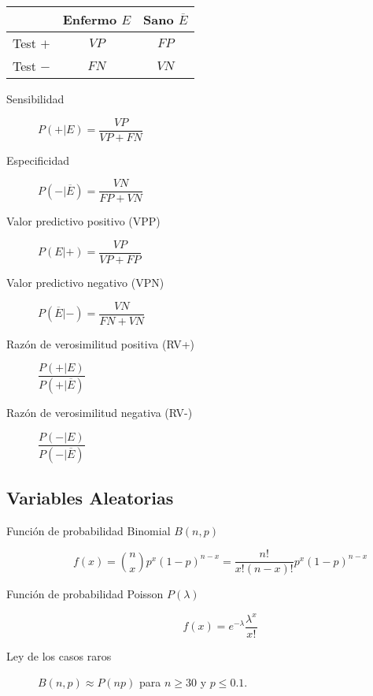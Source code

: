 \begin{multicols*}{2}
\begin{tcolorbox}[hbox, title=Test diagnósticos]
\begin{minipage}{0.4\textwidth}
\begin{center}
\begin{tabular}{|l|c|c|}
\cline{2-3}
\multicolumn{1}{c|}{} & Enfermo $E$ & Sano $\overline E$ \\
\hline
Test $+$              & $VP$    & $FP$ \\
\hline
Test $-$              & $FN$    & $VN$ \\
\hline
\end{tabular}
\end{center}
\begin{description}
\item[Sensibilidad] $P(+|E)=\dfrac{VP}{VP+FN}$
\item[Especificidad] $P(-|\overline{E})=\dfrac{VN}{FP+VN}$
\item[Valor predictivo positivo (VPP)] $P(E|+)=\dfrac{VP}{VP+FP}$
\item[Valor predictivo negativo (VPN)] $P(\overline{E}|-)=\dfrac{VN}{FN+VN}$
\item[Razón de verosimilitud positiva (RV+)] $\dfrac{P(+|E)}{P(+|\overline{E})}$
\item[Razón de verosimilitud negativa (RV-)] $\dfrac{P(-|E)}{P(-|\overline{E})}$
\end{description}
\end{minipage}
\end{tcolorbox}


\subsection*{Variables Aleatorias}

\begin{tcolorbox}[hbox, title=Discretas]
\begin{minipage}{0.4\textwidth}
\begin{description}
\item [Función de probabilidad Binomial $B(n,p)$]
      \[f(x)=\binom{n}{x}p^x (1-p)^{n-x}=\dfrac{n!}{x!(n-x)!}p^x (1-p)^{n-x}\]
\item [Función de probabilidad Poisson $P(\lambda)$]
      \[f(x)=e^{-\lambda}\frac{\lambda^x}{x!}\]
\item [Ley de los casos raros] $B(n,p)\approx P(np)$ para $n\geq 30$ y $p\leq 0.1$.
\end{description}
\end{minipage}
\end{tcolorbox}


\end{multicols*}

